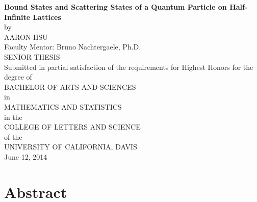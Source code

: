 \documentclass{article}
\numberwithin{equation}{section}
\numberwithin{theorem}{section}
\numberwithin{proposition}{section}
\numberwithin{lemma}{section}
\numberwithin{corollary}{section}
\numberwithin{definition}{section}
\begin{document}
\begin{centering}
\thispagestyle{empty}
\large{\textbf{Bound States and Scattering States of a Quantum Particle on Half-Infinite Lattices}} \\
\vspace{5 mm}
\normalsize{by} \\
\vspace{5 mm}
AARON HSU \\
\vspace{5 mm}
Faculty Mentor: Bruno Nachtergaele, Ph.D. \\
\vspace{5 mm}
SENIOR THESIS\\
\vspace{5 mm}
Submitted in partial satisfaction of the requirements for Highest Honors for the degree of \\
\vspace{5 mm}
BACHELOR OF ARTS AND SCIENCES \\
\vspace{5 mm}
in \\
\vspace{5 mm}
MATHEMATICS AND STATISTICS \\
\vspace{5 mm}
in the \\
\vspace{5 mm}
COLLEGE OF LETTERS AND SCIENCE \\
\vspace{5 mm}
of the \\
\vspace{5 mm}
UNIVERSITY OF CALIFORNIA, DAVIS \\
\vspace{5 mm}
June 12, 2014

\end{centering}
\newpage

\tableofcontents
\newpage

\section*{Abstract}
\end{document}
